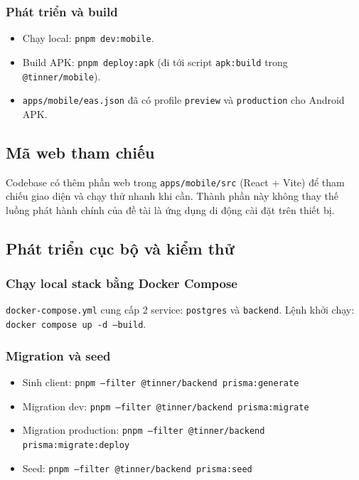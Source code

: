 \subsubsection{Phát triển và build}

\begin{itemize}
  \item Chạy local: \texttt{pnpm dev:mobile}.
  \item Build APK: \texttt{pnpm deploy:apk} (đi tới script \texttt{apk:build} trong \texttt{@tinner/mobile}).
  \item \texttt{apps/mobile/eas.json} đã có profile \texttt{preview} và \texttt{production} cho Android APK.
\end{itemize}

\subsection{Mã web tham chiếu}

Codebase có thêm phần web trong \texttt{apps/mobile/src} (React + Vite) để tham chiếu giao diện và chạy thử nhanh khi cần. Thành phần này không thay thế luồng phát hành chính của đề tài là ứng dụng di động cài đặt trên thiết bị.

\subsection{Phát triển cục bộ và kiểm thử}

\subsubsection{Chạy local stack bằng Docker Compose}

\texttt{docker-compose.yml} cung cấp 2 service: \texttt{postgres} và \texttt{backend}. Lệnh khởi chạy: \texttt{docker compose up -d --build}.

\subsubsection{Migration và seed}

\begin{itemize}
  \item Sinh client: \texttt{pnpm --filter @tinner/backend prisma:generate}
  \item Migration dev: \texttt{pnpm --filter @tinner/backend prisma:migrate}
  \item Migration production: \texttt{pnpm --filter @tinner/backend prisma:migrate:deploy}
  \item Seed: \texttt{pnpm --filter @tinner/backend prisma:seed}
\end{itemize}

